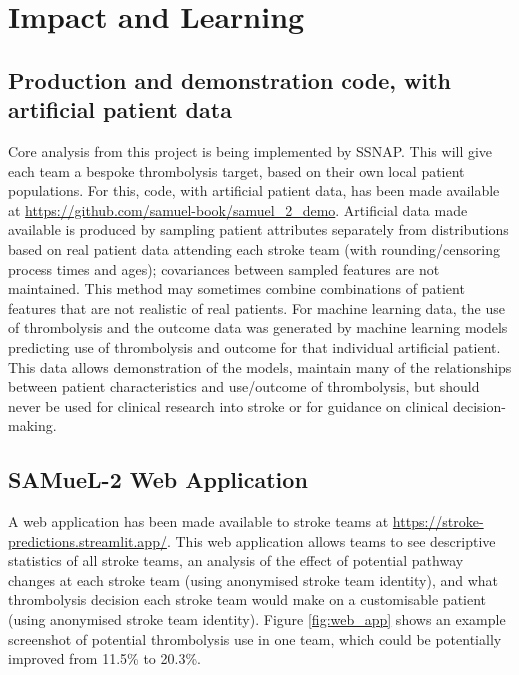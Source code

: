 \section{Impact and Learning}

\subsection{Production and demonstration code, with artificial patient data}

Core analysis from this project is being implemented by SSNAP. This will give each team a bespoke thrombolysis target, based on their own local patient populations. For this, code, with artificial patient data, has been made available at \url{https://github.com/samuel-book/samuel_2_demo}. Artificial data made available is produced by sampling patient attributes separately from distributions based on real patient data attending each stroke team (with rounding/censoring process times and ages); covariances between sampled features are not maintained. This method may sometimes combine combinations of patient features that are not realistic of real patients. For machine learning data, the use of thrombolysis and the outcome data was generated by machine learning models predicting use of thrombolysis and outcome for that individual artificial patient. This data allows demonstration of the models, maintain many of the relationships between patient characteristics and use/outcome of thrombolysis, but should never be used for clinical research into stroke or for guidance on clinical decision-making.

\subsection{SAMueL-2 Web Application}

A web application has been made available to stroke teams at \url{https://stroke-predictions.streamlit.app/}. This web application allows teams to see descriptive statistics of all stroke teams, an analysis of the effect of potential pathway changes at each stroke team (using anonymised stroke team identity), and what thrombolysis decision each stroke team would make on a customisable patient (using anonymised stroke team identity). Figure \ref{fig:web_app} shows an example screenshot of potential thrombolysis use in one team, which could be potentially improved from 11.5\% to 20.3\%.

